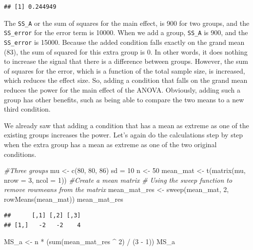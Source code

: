 \documentclass[
]{book}
\newenvironment{Shaded}{\begin{snugshade}}{\end{snugshade}}
\newcommand{\AttributeTok}[1]{\textcolor[rgb]{0.77,0.63,0.00}{#1}}
\newcommand{\CommentTok}[1]{\textcolor[rgb]{0.56,0.35,0.01}{\textit{#1}}}
\newcommand{\DecValTok}[1]{\textcolor[rgb]{0.00,0.00,0.81}{#1}}
\newcommand{\FunctionTok}[1]{\textcolor[rgb]{0.00,0.00,0.00}{#1}}
\newcommand{\NormalTok}[1]{#1}
\newcommand{\OtherTok}[1]{\textcolor[rgb]{0.56,0.35,0.01}{#1}}
\newcommand{\SpecialCharTok}[1]{\textcolor[rgb]{0.00,0.00,0.00}{#1}}
\begin{document}
\begin{verbatim}
## [1] 0.244949
\end{verbatim}

The \texttt{SS\_A} or the sum of squares for the main effect, is 900 for two groups, and the \texttt{SS\_error} for the error term is 10000. When we add a group, \texttt{SS\_A} is 900, and the \texttt{SS\_error} is 15000. Because the added condition falls exactly on the grand mean (83), the sum of squared for this extra group is 0. In other words, it does nothing to increase the signal that there is a difference between groups. However, the sum of squares for the error, which is a function of the total sample size, is increased, which reduces the effect size. So, adding a condition that falls on the grand mean reduces the power for the main effect of the ANOVA. Obviously, adding such a group has other benefits, such as being able to compare the two means to a new third condition.

We already saw that adding a condition that has a mean as extreme as one of the existing groups increases the power. Let's again do the calculations step by step when the extra group has a mean as extreme as one of the two original conditions.

\begin{Shaded}
\begin{Highlighting}[]
\CommentTok{\#Three groups}
\NormalTok{mu }\OtherTok{\textless{}{-}} \FunctionTok{c}\NormalTok{(}\DecValTok{80}\NormalTok{, }\DecValTok{80}\NormalTok{, }\DecValTok{86}\NormalTok{)}
\NormalTok{sd }\OtherTok{=} \DecValTok{10}
\NormalTok{n }\OtherTok{\textless{}{-}} \DecValTok{50}
\NormalTok{mean\_mat }\OtherTok{\textless{}{-}} \FunctionTok{t}\NormalTok{(}\FunctionTok{matrix}\NormalTok{(mu, }\AttributeTok{nrow =} \DecValTok{3}\NormalTok{, }\AttributeTok{ncol =} \DecValTok{1}\NormalTok{)) }\CommentTok{\#Create a mean matrix}
\CommentTok{\# Using the sweep function to remove rowmeans from the matrix}
\NormalTok{mean\_mat\_res }\OtherTok{\textless{}{-}} \FunctionTok{sweep}\NormalTok{(mean\_mat, }\DecValTok{2}\NormalTok{, }\FunctionTok{rowMeans}\NormalTok{(mean\_mat))}
\NormalTok{mean\_mat\_res}
\end{Highlighting}
\end{Shaded}

\begin{verbatim}
##      [,1] [,2] [,3]
## [1,]   -2   -2    4
\end{verbatim}

\begin{Shaded}
\begin{Highlighting}[]
\NormalTok{MS\_a }\OtherTok{\textless{}{-}}\NormalTok{ n }\SpecialCharTok{*}\NormalTok{ (}\FunctionTok{sum}\NormalTok{(mean\_mat\_res }\SpecialCharTok{\^{}} \DecValTok{2}\NormalTok{) }\SpecialCharTok{/}\NormalTok{ (}\DecValTok{3} \SpecialCharTok{{-}} \DecValTok{1}\NormalTok{))}
\NormalTok{MS\_a}
\end{Highlighting}
\end{Shaded}
\end{document}

